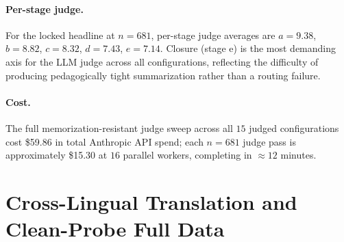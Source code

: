 \documentclass[11pt]{article}
\begin{document}
\begin{table}[h]
  \centering
  \small
  \caption{Per-axis judge scores for the locked headline and three control cells at $n{=}681$. All cells score nearly identically on the age-appropriateness and question-form axes (the teacher's surface behavior is consistent across consultant swaps). The headline's advantage concentrates on Socratic validity and learning advancement, the two axes that reward correct pedagogical routing.}
  \label{tab:app-judge}
\end{table}

\paragraph{Per-stage judge.} For the locked headline at $n{=}681$, per-stage judge averages are $a{=}9.38$, $b{=}8.82$, $c{=}8.32$, $d{=}7.43$, $e{=}7.14$. Closure (stage e) is the most demanding axis for the LLM judge across all configurations, reflecting the difficulty of producing pedagogically tight summarization rather than a routing failure.

\paragraph{Cost.} The full memorization-resistant judge sweep across all $15$ judged configurations cost \$59.86 in total Anthropic API spend; each $n{=}681$ judge pass is approximately \$15.30 at $16$ parallel workers, completing in $\approx 12$ minutes.

\section{Cross-Lingual Translation and Clean-Probe Full Data}
\label{app:critique}
\end{document}
